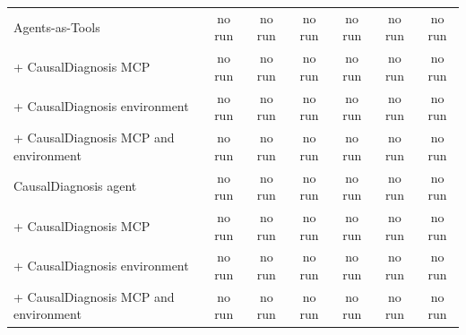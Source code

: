 \documentclass[10pt]{article}
\begin{document}
\begin{table}[H]
\begin{tabular}{lcccccc}
\addlinespace[3pt]
Agents-as-Tools & no run & no run & no run & no run & no run & no run \\
\quad + CausalDiagnosis MCP & no run & no run & no run & no run & no run & no run \\
\quad + CausalDiagnosis environment & no run & no run & no run & no run & no run & no run \\
\quad + CausalDiagnosis MCP and environment & no run & no run & no run & no run & no run & no run \\
\addlinespace[3pt]
CausalDiagnosis agent & no run & no run & no run & no run & no run & no run \\
\quad + CausalDiagnosis MCP & no run & no run & no run & no run & no run & no run \\
\quad + CausalDiagnosis environment & no run & no run & no run & no run & no run & no run \\
\quad + CausalDiagnosis MCP and environment & no run & no run & no run & no run & no run & no run \\
\bottomrule
\end{tabular}
\end{table}
\vspace{-8pt}
\end{document}

